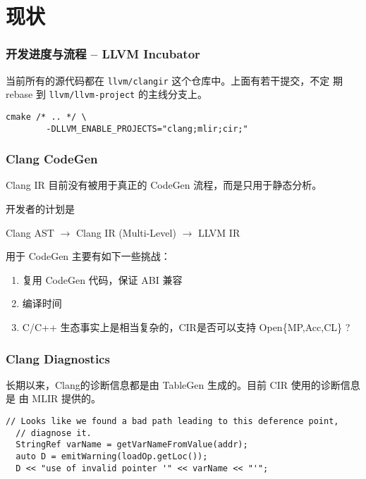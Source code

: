\section{现状}

\begin{frame}[fragile]
    \frametitle{开发进度与流程 -- LLVM Incubator}

    当前所有的源代码都在 \texttt{llvm/clangir} 这个仓库中。上面有若干提交，不定
    期 rebase 到 \texttt{llvm/llvm-project} 的主线分支上。

    \vspace{2em}
    \begin{lstlisting}[caption=启用ClangIR目前需要的编译指令]
        cmake /* .. */ \
        -DLLVM_ENABLE_PROJECTS="clang;mlir;cir;"
    \end{lstlisting}


\end{frame}

\begin{frame}
    \frametitle{Clang CodeGen}

    Clang IR 目前没有被用于真正的 CodeGen 流程，而是只用于静态分析。

    开发者的计划是
    \begin{center}
        Clang AST $\rightarrow$ Clang IR (Multi-Level) $\rightarrow$ LLVM IR
    \end{center}

    用于 CodeGen 主要有如下一些挑战：

    \begin{enumerate}
        \item 复用 CodeGen 代码，保证 ABI 兼容
        \item 编译时间
        \item C/C++ 生态事实上是相当复杂的，CIR是否可以支持 Open\{MP,Acc,CL\} ?
    \end{enumerate}
\end{frame}

\begin{frame}[fragile]
    \frametitle{Clang Diagnostics}

    长期以来，Clang的诊断信息都是由 TableGen 生成的。目前 CIR 使用的诊断信息是
    由 MLIR 提供的。

    \vspace{1em}

    \begin{lstlisting}[caption=LifetimeCheckPass 中输出诊断信息相关的代码]
  // Looks like we found a bad path leading to this deference point,
  // diagnose it.
  StringRef varName = getVarNameFromValue(addr);
  auto D = emitWarning(loadOp.getLoc());
  D << "use of invalid pointer '" << varName << "'";
    \end{lstlisting}

\end{frame}

